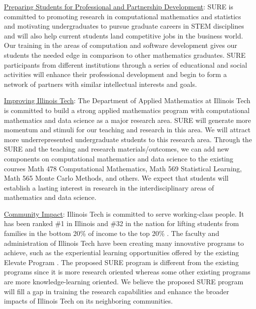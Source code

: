 \documentclass[11pt]{NSFamsart}
\newcommand{\Upara}[1]{\noindent\underline{\upshape #1}:}
\begin{document}
\Upara{Preparing Students for Professional and Partnership Development} 
SURE is committed to promoting research in computational mathematics and statistics and motivating undergraduates to pursue graduate careers in STEM disciplines and will also help current students land competitive jobs in the business world. Our training in the areas of computation and software development gives our students the needed edge in comparison to other mathematics graduates. SURE participants from different institutions through a series of educational and social activities will enhance their professional development and begin to form a network of partners with similar intellectual interests and goals. 

\Upara{Improving Illinois Tech}
The Department of Applied Mathematics at Illinois Tech is committed to build a strong applied mathematics program with computational mathematics and data science as a major research area. 
SURE will generate more momentum and stimuli for our teaching and research in this area. We will attract more underrepresented undergraduate students to this research area. Through the SURE and the teaching and research materials/outcomes, we can add new components on computational mathematics and data science to the existing courses Math 478 Computational Mathematics, Math 569 Statistical Learning, Math 565 Monte Carlo Methods, and others. 
We expect that students will establish a lasting interest in research in the interdisciplinary areas of mathematics and data science.

\Upara{Community Impact}
Illinois Tech is committed to serve working-class people. 
It has been ranked \#1 in Illinois and \#32 in the nation for lifting students from families in the bottom 20\% of income to the top 20\% \cite{IITrank}. 
The faculty and administration of Illinois Tech have been creating many innovative programs to achieve, such as the experiential learning opportunities offered by the existing Elevate Program \cite{IITElevate}.
The proposed SURE program is different from the existing programs since it is more research oriented whereas some other existing programs are more knowledge-learning oriented. 
We believe the proposed SURE program will fill a gap in training the research capabilities and enhance the broader impacts of Illinois Tech on its neighboring communities. 
\end{document}
